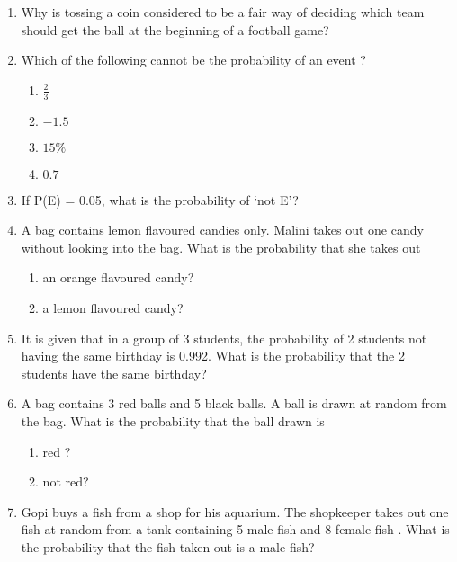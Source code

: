 \begin{enumerate}[label=\thechapter.\arabic*,ref=\thechapter.\theenumi]
	\item Why is tossing a coin considered to be a fair way of deciding which team should get the ball at the beginning of a football game?
		\\
\solution

	\item Which of the following cannot be the probability of an event ? 
\begin{enumerate}
\item $\frac{2}{3}$ 
\item $-1.5$ 
\item $15\%$ 
\item $0.7$ 
\end{enumerate}
\solution

\item If P(E) = 0.05, what is the probability of ‘not E’?\\
\solution

\item A bag contains lemon flavoured candies only. Malini takes out one candy without looking into the bag. What is the probability that she takes out
\begin{enumerate}
	\item an orange flavoured candy?
	\item a lemon flavoured candy?
\end{enumerate}
\solution

\item It is given that in a group of 3 students, the probability of 2 students not having the same birthday is 0.992. What is the probability that the 2 students have the same birthday?
	\\
\solution

\item A bag contains 3 red balls and 5 black balls. A ball is drawn at random from the bag.
What is the probability that the ball drawn is
\begin{enumerate}[label=(\roman*)] \item red ? \item not red? \end{enumerate}
\solution

\item Gopi buys a fish from a shop for his aquarium. The shopkeeper takes out one fish at random from a tank containing 5 male fish and 8 female fish . What is the probability that the fish taken out is a male fish?
	\\

\end{enumerate}
